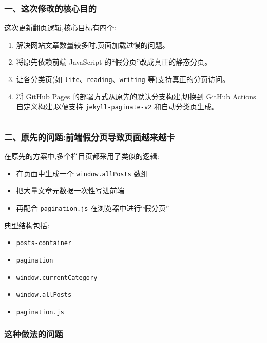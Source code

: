 \documentclass[lang=cn,scheme=chinese,color=blue,device=normal,toc=onecol,math=cm]{elegantbook}
\begin{document}
\subsubsection{一、这次修改的核心目的}


这次更新翻页逻辑,核心目标有四个:\par


\begin{enumerate}
\item 解决网站文章数量较多时,页面加载过慢的问题。
\item 将原先依赖前端 JavaScript 的“假分页”改成真正的静态分页。
\item 让各分类页(如 \texttt{life}、\texttt{reading}、\texttt{writing} 等)支持真正的分页访问。
\item 将 GitHub Pages 的部署方式从原先的默认分支构建,切换到 GitHub Actions 自定义构建,以便支持 \texttt{jekyll-paginate-v2} 和自动分类页生成。
\end{enumerate}


\medskip\hrule\medskip


\subsubsection{二、原先的问题:前端假分页导致页面越来越卡}


在原先的方案中,多个栏目页都采用了类似的逻辑:\par


\begin{itemize}
\item 在页面中生成一个 \texttt{window.allPosts} 数组
\item 把大量文章元数据一次性写进前端
\item 再配合 \texttt{pagination.js} 在浏览器中进行“假分页”
\end{itemize}


典型结构包括:\par


\begin{itemize}
\item \texttt{posts-container}
\item \texttt{pagination}
\item \texttt{window.currentCategory}
\item \texttt{window.allPosts}
\item \texttt{pagination.js}
\end{itemize}


\subsubsection{这种做法的问题}
\end{document}
